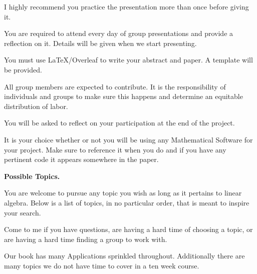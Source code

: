 \documentclass{article}
\begin{document}
\begin{description}[font=\normalfont\itshape-\space]
	I highly recommend you practice the presentation more than once before giving it.
	\item[Reflections] You are required to attend every day of group presentations and provide a reflection on it.  Details will be given when we start presenting.
	\item[Document Preparation] You must use \LaTeX/Overleaf to write your abstract and paper.  A template will be provided.
	\item[Participation] All group members are expected to contribute.  It is the responsibility of individuals and groups to make sure this happens and determine an equitable distribution of labor.
	
	You will be asked to reflect on your participation at the end of the project.
	\item[Computational Software] It is your choice whether or not you will be using any Mathematical Software for your project.  Make sure to reference it when you do and if you have any pertinent code it appears somewhere in the paper.
\end{description}

\noindent\hypertarget{topics}{\textbf{Possible Topics.}}

You are welcome to pursue any topic you wish as long as it pertains to linear algebra.  Below is a list of topics, in no particular order, that is meant to inspire your search.

Come to me if you have questions, are having a hard time of choosing a topic, or are having a hard time finding a group to work with.

Our book has many Applications sprinkled throughout.  Additionally there are many topics we do not have time to cover in a ten week course.
\end{document}
